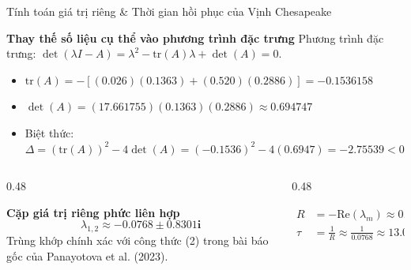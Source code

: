 \documentclass[aspectratio=169, 10pt]{beamer}
\begin{document}
\begin{frame}{Tính toán giá trị riêng \& Thời gian hồi phục của Vịnh Chesapeake}
  \begin{block}{\textbf{Thay thế số liệu cụ thể vào phương trình đặc trưng}}
    \footnotesize
    Phương trình đặc trưng: $\det(\lambda I - A) = \lambda^2 - \mathrm{tr}(A)\lambda + \det(A) = 0$.
    \begin{itemize}
      \item $\mathrm{tr}(A) = -[(0.026)(0.1363) + (0.520)(0.2886)] = \mathbf{-0.1536158}$
      \item $\det(A) = (17.661755)(0.1363)(0.2886) \approx \mathbf{0.694747}$
      \item Biệt thức: $\Delta = (\mathrm{tr}(A))^2 - 4\det(A) = (-0.1536)^2 - 4(0.6947) = \mathbf{-2.75539} < 0$
    \end{itemize}
  \end{block}

  \vspace{0.1cm}

  \begin{columns}[c]
    \begin{column}{0.48\textwidth}
      \begin{exampleblock}{\textbf{Cặp giá trị riêng phức liên hợp}}
        \footnotesize
        \begin{equation}
        \lambda_{1, 2} \approx \mathbf{-0.0768 \pm 0.8301i}
        \end{equation}
        Trùng khớp chính xác với công thức (2) trong bài báo gốc của Panayotova et al. (2023).
      \end{exampleblock}
    \end{column}

    \begin{column}{0.48\textwidth}
      \begin{tcolorbox}[colback=OceanLight, colframe=OceanNavy, arc=2mm, title=\textbf{Độ đàn hồi \& Thời gian hồi phục}]
        \footnotesize
        \begin{align}
        R &= -\mathrm{Re}(\lambda_m) \approx \mathbf{0.0768\text{ năm}^{-1}} \\[2pt]
        \tau &= \frac{1}{R} \approx \frac{1}{0.0768} \approx \mathbf{13.021\text{ năm}}
        \end{align}
      \end{tcolorbox}
    \end{column}
  \end{columns}
\end{frame}
\end{document}
